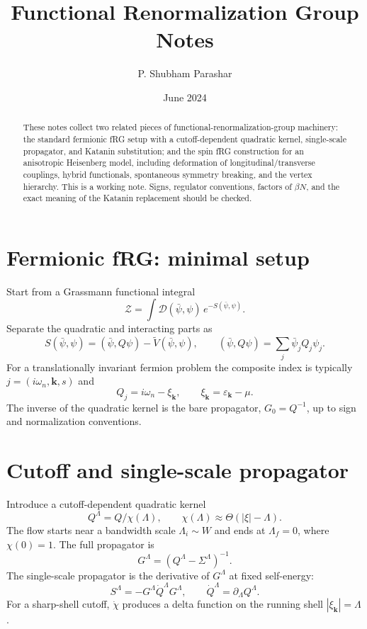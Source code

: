\documentclass[11pt]{article}
\title{Functional Renormalization Group Notes\\\large }
\author{P. Shubham Parashar}
\date{June 2024}
\begin{document}
\maketitle

\begin{abstract}
These notes collect two related pieces of functional-renormalization-group machinery: the standard fermionic fRG setup with a cutoff-dependent quadratic kernel, single-scale propagator, and Katanin substitution; and the spin fRG construction for an anisotropic Heisenberg model, including deformation of longitudinal/transverse couplings, hybrid functionals, spontaneous symmetry breaking, and the vertex hierarchy. This is a working note. Signs, regulator conventions, factors of $\beta N$, and the exact meaning of the Katanin replacement should be checked.
\end{abstract}

\section{Fermionic fRG: minimal setup}

Start from a Grassmann functional integral
\begin{equation}
\mathcal Z=\int \mathcal D(\bar\psi,\psi)\,e^{-S(\bar\psi,\psi)}.
\end{equation}
Separate the quadratic and interacting parts as
\begin{equation}
S(\bar\psi,\psi)=(\bar\psi,Q\psi)-\widetilde V(\bar\psi,\psi),
\qquad
(\bar\psi,Q\psi)=\sum_j\bar\psi_jQ_j\psi_j.
\end{equation}
For a translationally invariant fermion problem the composite index is typically $j=(i\omega_n,\mathbf k,s)$ and
\begin{equation}
Q_j=i\omega_n-\xi_{\mathbf k},\qquad \xi_{\mathbf k}=\varepsilon_{\mathbf k}-\mu.
\end{equation}
The inverse of the quadratic kernel is the bare propagator, $G_0=Q^{-1}$, up to sign and normalization conventions.

\section{Cutoff and single-scale propagator}

Introduce a cutoff-dependent quadratic kernel
\begin{equation}
Q^\Lambda=Q/\chi(\Lambda),
\qquad
\chi(\Lambda)\approx \Theta(|\xi|-\Lambda).
\end{equation}
The flow starts near a bandwidth scale $\Lambda_i\sim W$ and ends at $\Lambda_f=0$, where $\chi(0)=1$. The full propagator is
\begin{equation}
G^\Lambda=\left(Q^\Lambda-\Sigma^\Lambda\right)^{-1}.
\end{equation}
The single-scale propagator is the derivative of $G^\Lambda$ at fixed self-energy:
\begin{equation}
S^\Lambda=-G^\Lambda\dot Q^\Lambda G^\Lambda,
\qquad \dot Q^\Lambda=\partial_\Lambda Q^\Lambda.
\end{equation}
For a sharp-shell cutoff, $\dot\chi$ produces a delta function on the running shell $|\xi_{\mathbf k}|=\Lambda$.
\end{document}
